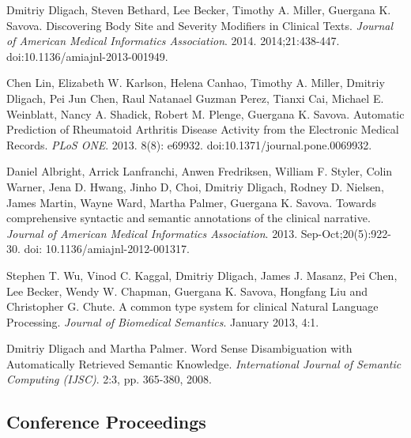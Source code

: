 \documentclass[letterpaper]{article}
\renewenvironment{itemize}{
  \begin{list}{}{
    \setlength{\leftmargin}{1.5em}
  }
}{
  \end{list}
}
\begin{document}
\begin{itemize}
\item Dmitriy Dligach, Steven Bethard, Lee Becker, Timothy A. Miller, Guergana K. Savova. Discovering Body Site and Severity Modifiers in Clinical Texts. \emph{Journal of American Medical Informatics Association}. 2014. 2014;21:438-447. doi:10.1136/amiajnl-2013-001949.
\item Chen Lin, Elizabeth W. Karlson, Helena Canhao, Timothy A. Miller, Dmitriy Dligach, Pei Jun Chen, Raul Natanael Guzman Perez, Tianxi Cai, Michael E. Weinblatt, Nancy A. Shadick, Robert M. Plenge, Guergana K. Savova. Automatic Prediction of Rheumatoid Arthritis Disease Activity from the Electronic Medical Records. \emph{PLoS ONE}. 2013. 8(8): e69932. doi:10.1371/journal.pone.0069932.
\item Daniel Albright, Arrick Lanfranchi, Anwen Fredriksen, William F. Styler, Colin Warner, Jena D. Hwang, Jinho D, Choi, Dmitriy Dligach, Rodney D. Nielsen, James Martin, Wayne Ward, Martha Palmer, Guergana K. Savova. Towards comprehensive syntactic and semantic annotations of the clinical narrative. \emph{Journal of American Medical Informatics Association}. 2013. Sep-Oct;20(5):922-30. doi: 10.1136/amiajnl-2012-001317.
\item Stephen T. Wu, Vinod C. Kaggal, Dmitriy Dligach, James J. Masanz, Pei Chen, Lee Becker, Wendy W. Chapman, Guergana K. Savova, Hongfang Liu and Christopher G. Chute. A common type system for clinical Natural Language Processing. \emph{Journal of Biomedical Semantics}. January 2013, 4:1.
\item Dmitriy Dligach and Martha Palmer. Word Sense Disambiguation with Automatically Retrieved Semantic Knowledge. \emph {International Journal of Semantic Computing (IJSC)}. 2:3, pp. 365-380, 2008.
\end{itemize}

\subsection*{Conference Proceedings}
\end{document}
